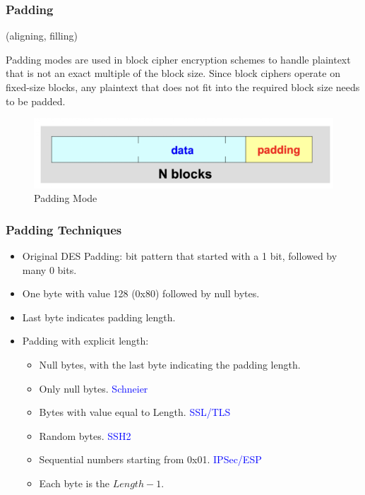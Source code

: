 \subsubsection{Padding}
\begin{center}
    (aligning, filling)
\end{center}

Padding modes are used in block cipher encryption schemes to handle plaintext that is not an exact multiple of the block size. Since block ciphers operate on fixed-size blocks, any plaintext that does not fit into the required block size needs to be padded.
\begin{figure}[H]
    \centering
    \includegraphics[width=0.5\linewidth]{Images/Cryptography/padding.png}
    \caption{Padding Mode}
    
\end{figure}

\subsubsection*{Padding Techniques}
\begin{itemize}
    \item Original DES Padding: bit pattern that started with a 1 bit, followed by many 0 bits.
    \item One byte with value 128 (0x80) followed by null bytes.
    \item Last byte indicates padding length.
    \item Padding with explicit length:
    \begin{itemize}
        \item Null bytes, with the last byte indicating the padding length.
        \item Only null bytes. \textcolor{Blue}{Schneier}
        \item Bytes with value equal to Length. \textcolor{Blue}{SSL/TLS}
        \item Random bytes. \textcolor{Blue}{SSH2}
        \item Sequential numbers starting from 0x01. \textcolor{Blue}{IPSec/ESP}
        \item Each byte is the $Length-1$.
    \end{itemize}
\end{itemize}

